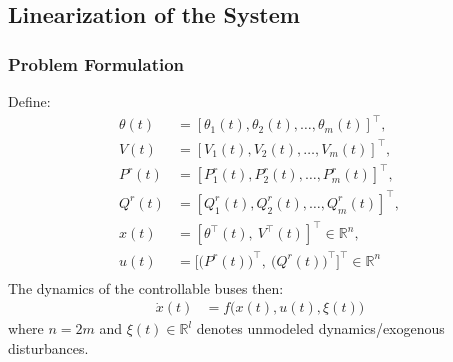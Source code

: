 \documentclass[
    aspectratio=169,
    \ifdefined\HANDOUT
    handout
    \else
    \fi
]{beamer}
\begin{document}
\subsection*{Linearization of the System}
\begin{frame}
    \frametitle{Problem Formulation}
    Define:
    \begin{align*}
        \theta(t) & = [\theta_1(t), \theta_2(t), \dots,
        \theta_m(t)]^\top,                                                                  \\
        V(t)      & = [V_1(t), V_2(t), \dots, V_m(t)]^\top,                                 \\
        P^r(t)    & = [P_1^r(t),  P_2^r(t), \dots,  P_m^r(t)]^\top,                         \\
        Q^r(t)    & = [Q_1^r(t), Q_2^r(t), \dots,
        Q_m^r(t)]^\top,                                                                     \\
        x(t)      & = [\theta^\top (t), ~V^\top (t)]^\top \in \mathbb{R}^n,                 \\
        u(t)      & = \big[\big(P^r(t))^\top, ~\big(Q^r(t))^\top\big]^\top \in \mathbb{R}^n \\
    \end{align*}
    The dynamics of the controllable buses then:
    \begin{align*}
        \dot{x}(t) & = f\big(x(t),u(t),\xi(t)\big)
    \end{align*}
    where $n=2m$ and $\xi(t)\in \mathbb{R}^l$ denotes unmodeled dynamics/exogenous disturbances.
\end{frame}
\end{document}
